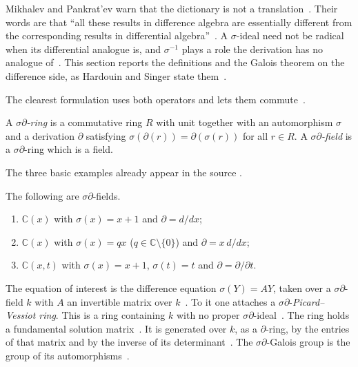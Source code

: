 Mikhalev and Pankrat'ev warn that the dictionary is not a
translation~\cite[p.~912]{MikhalevPankratev1989}. Their words are that ``all
these results in difference algebra are essentially different from the
corresponding results in differential
algebra''~\cite[p.~912]{MikhalevPankratev1989}. A $\sigma$-ideal need not be
radical when its differential analogue is, and $\sigma^{-1}$ plays a role the
derivation has no analogue of~\cite[p.~912]{MikhalevPankratev1989}. This
section reports the definitions and the Galois theorem on the difference side,
as Hardouin and Singer state them~\cite[pp.~5--6]{HardouinSinger2008}.

The clearest formulation uses both operators and lets them
commute~\cite[Definition~2.1, p.~5]{HardouinSinger2008}.

\begin{definition}\label{def:diffalg:sigma-delta-ring}
A \emph{$\sigma\partial$-ring} is a commutative ring $R$ with unit
together with an automorphism $\sigma$ and a derivation $\partial$
satisfying $\sigma(\partial(r)) = \partial(\sigma(r))$ for all
$r \in R$. A \emph{$\sigma\partial$-field} is a $\sigma\partial$-ring
which is a field.
\end{definition}

The three basic examples already appear in the source
\cite[Example~2.2, p.~5]{HardouinSinger2008}.

\begin{example}\label{ex:diffalg:sigma-delta-examples}
The following are $\sigma\partial$-fields.
\begin{enumerate}
\item $\mathbb{C}(x)$ with $\sigma(x) = x+1$ and $\partial = d/dx$;
\item $\mathbb{C}(x)$ with $\sigma(x) = qx$ ($q\in\mathbb{C}\setminus\{0\}$)
  and $\partial = x\,d/dx$;
\item $\mathbb{C}(x,t)$ with $\sigma(x) = x+1$, $\sigma(t)=t$ and
  $\partial = \partial/\partial t$.
\end{enumerate}
\end{example}

The equation of interest is the difference equation $\sigma(Y) = AY$, taken
over a $\sigma\partial$-field $k$ with $A$ an invertible matrix over
$k$~\cite[pp.~5--6]{HardouinSinger2008}. To it one attaches a
$\sigma\partial$-\emph{Picard--Vessiot ring}. This is a ring containing $k$
with no proper $\sigma\partial$-ideal~\cite[Definition~2.3,
p.~5]{HardouinSinger2008}. The ring holds a fundamental solution
matrix~\cite[Definition~2.3, p.~5]{HardouinSinger2008}. It is generated over
$k$, as a $\partial$-ring, by the entries of that matrix and by the inverse of
its determinant~\cite[Definition~2.3, p.~5]{HardouinSinger2008}. The
$\sigma\partial$-Galois group is the group of its
automorphisms~\cite[Definition~2.5, p.~6]{HardouinSinger2008}.

